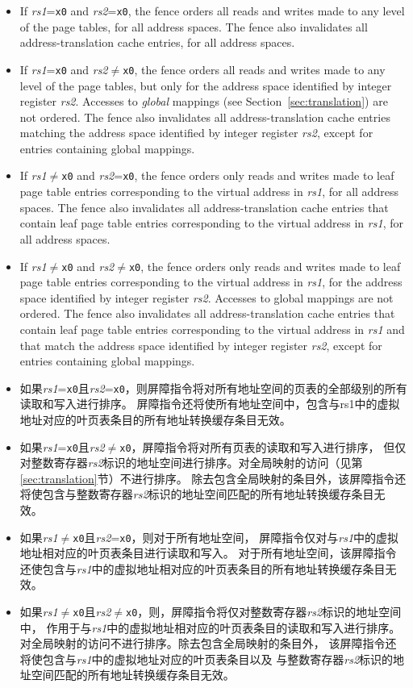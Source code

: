 \begin{itemize}
  \item If {\em rs1}={\tt x0} and {\em rs2}={\tt x0}, the fence orders all
  reads and writes made to any level of the page tables, for all
  address spaces.  The fence also invalidates all address-translation
  cache entries, for all address spaces.
\item If {\em rs1}={\tt x0} and {\em rs2}$\neq${\tt x0}, the fence orders
  all reads and writes made to any level of the page tables, but only
  for the address space identified by integer register {\em rs2}.
  Accesses to {\em global} mappings (see Section~\ref{sec:translation})
  are not ordered.  The fence also invalidates all address-translation
  cache entries matching the address space identified by integer register
  {\em rs2}, except for entries containing global mappings.
\item If {\em rs1}$\neq${\tt x0} and {\em rs2}={\tt x0}, the fence orders
  only reads and writes made to leaf page table entries corresponding
  to the virtual address in {\em rs1}, for all address spaces.
  The fence also invalidates all address-translation cache entries that
  contain leaf page table entries corresponding to the virtual address
  in {\em rs1}, for all address spaces.
\item If {\em rs1}$\neq${\tt x0} and {\em rs2}$\neq${\tt x0}, the fence
  orders only reads and writes made to leaf page table entries
  corresponding to the virtual address in {\em rs1}, for the address
  space identified by integer register {\em rs2}.
  Accesses to global mappings are not ordered.  The fence also
  invalidates all address-translation cache entries that contain leaf
  page table entries corresponding to the virtual address in {\em rs1}
  and that match the address space identified by integer register {\em
  rs2}, except for entries containing global mappings.

\item 如果{\em rs1}={\tt x0}且{\em rs2}={\tt x0}，则屏障指令将对所有地址空间的页表的全部级别的所有读取和写入进行排序。
屏障指令还将使所有地址空间中，包含与rs1中的虚拟地址对应的叶页表条目的所有地址转换缓存条目无效。
\item 如果{\em rs1}={\tt x0}且{\em rs2}$\neq${\tt x0}，屏障指令将对所有页表的读取和写入进行排序，
但仅对整数寄存器{\em rs2}标识的地址空间进行排序。对全局映射的访问（见第\ref{sec:translation}节）不进行排序。
除去包含全局映射的条目外，该屏障指令还将使包含与整数寄存器{\em rs2}标识的地址空间匹配的所有地址转换缓存条目无效。
\item 如果{\em rs1}$\neq${\tt x0}且{\em rs2}={\tt x0}，则对于所有地址空间，
屏障指令仅对与{\em rs1}中的虚拟地址相对应的叶页表条目进行读取和写入。
对于所有地址空间，该屏障指令还使包含与{\em rs1}中的虚拟地址相对应的叶页表条目的所有地址转换缓存条目无效。
\item 如果{\em rs1}$\neq${\tt x0}且{\em rs2}$\neq${\tt x0}，则，屏障指令将仅对整数寄存器{\em rs2}标识的地址空间中，
作用于与{\em rs1}中的虚拟地址相对应的叶页表条目的读取和写入进行排序。
对全局映射的访问不进行排序。除去包含全局映射的条目外，
该屏障指令还将使包含与{\em rs1}中的虚拟地址对应的叶页表条目以及
与整数寄存器{\em rs2}标识的地址空间匹配的所有地址转换缓存条目无效。
\end{itemize}

